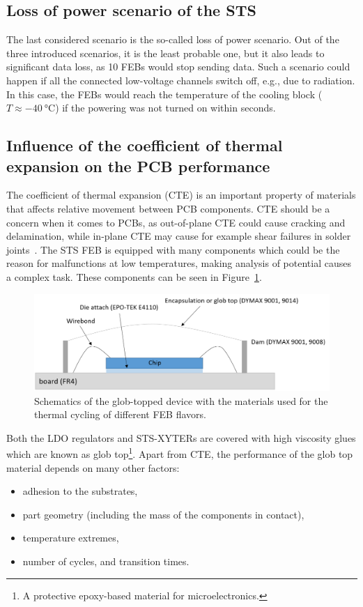 \subsection{Loss of power scenario of the STS}
\label{power_loss}
The last considered scenario is the so-called loss of power scenario. Out of the three introduced scenarios, it is the least probable one, but it also leads to significant data loss, as 10 \glspl{FEB} would stop sending data. Such a scenario could happen if all the connected low-voltage channels switch off, e.g., due to radiation. In this case, the \glspl{FEB} would reach the temperature of the cooling block ($T \approx \SI{-40}{\celsius}$) if the powering was not turned on within seconds.

\subsection{Influence of the coefficient of thermal expansion on the PCB performance}

The coefficient of thermal expansion (\gls{CTE}) is an important property of materials that affects relative movement between \gls{PCB} components. \gls{CTE} should be a concern when it comes to \glspl{PCB}, as out-of-plane \gls{CTE} could cause cracking and delamination, while in-plane \gls{CTE} may cause for example shear failures in solder joints~\cite{cte_report}. The \gls{STS} \gls{FEB} is equipped with many components which could be the reason for malfunctions at low temperatures, making analysis of potential causes a complex task. 
These components can be seen in Figure~\ref{fig_globtop}.
\begin{figure}[!h]
\centering
\includegraphics[width=0.85\columnwidth]{Chapter4/images/glob_topped_device.png}
\caption{Schematics of the glob-topped device with the materials used for the thermal cycling of different FEB flavors.}
\label{fig_globtop}
\end{figure}

Both the \gls{LDO} regulators and STS-XYTERs are covered with high viscosity glues which are known as glob top\footnote{A protective epoxy-based material for microelectronics.}. Apart from \gls{CTE}, the performance of the glob top material depends on many other factors:
\begin{itemize}
    \item adhesion to the substrates,
    \item part geometry (including the mass of the components in contact),
    \item temperature extremes,
    \item number of cycles, and transition times.
\end{itemize}


